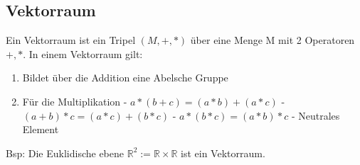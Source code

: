 \documentclass[10pt,a4paper]{article}
\begin{document}
\subsection{Vektorraum}
Ein Vektorraum ist ein Tripel $(M,+,*)$ über eine Menge M mit 2 Operatoren $+ , *$.
In einem Vektorraum gilt: 
\begin{enumerate}

\item Bildet über die Addition eine Abelsche Gruppe
\item Für die Multiplikation
\subitem - $ a*(b+c)= (a*b)+(a*c) $
\subitem - $ (a+b)*c= (a*c)+(b*c) $
\subitem - $ a*(b*c)= (a*b)*c $
\subitem - Neutrales Element 
\end{enumerate}
Bsp: Die Euklidische ebene $\mathbb{R}^2 := \mathbb{R}\times\mathbb{R}$ ist ein Vektorraum.


\newpage
\end{document}

